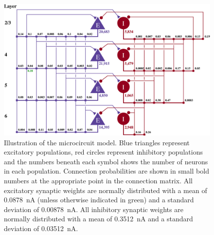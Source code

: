 \documentclass[utf8]{frontiersSCNS} %
\begin{document}
\begin{figure}[t!]
    \begin{center}
        \includegraphics[width=180mm]{figures/potjans_circuit_v2}
    \end{center}
    \caption{Illustration of the microcircuit model.
    Blue triangles represent excitatory populations, red circles represent inhibitory populations and the numbers beneath each symbol shows the number of neurons in each population.
    Connection probabilities are shown in small bold numbers at the appropriate point in the connection matrix.
    All excitatory synaptic weights are normally distributed with a mean of \SI{0.0878}{\nano\ampere} (unless otherwise indicated in green) and a standard deviation of \SI{0.00878}{\nano\ampere}.
    All inhibitory synaptic weights are normally distributed with a mean of \SI{0.3512}{\nano\ampere} and a standard deviation of \SI{0.03512}{\nano\ampere}.}
    \label{fig:potjans_circuit}
\end{figure}
%
\end{document}
